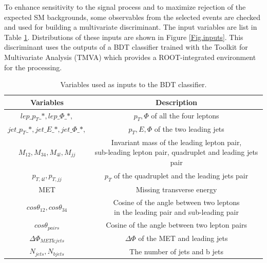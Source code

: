 To enhance sensitivity to the signal process and to maximize rejection of the expected SM backgrounds, some observables from the selected events are checked and used for building a multivariate discriminant. The input variables are list in Table \ref{Tab.bdt inputs}. Distributions of these inputs are shown in Figure \ref{Fig.inputs}. This discriminant uses the outputs of a BDT classifier trained with the Toolkit for Multivariate Analysis (TMVA) which provides a ROOT-integrated environment for the processing.

\begin{table}[H]
\begin{center}
\caption{Variables used as inputs to the BDT classifier.}
\label{Tab.bdt inputs}
\begin{tabular}{cc}
	\toprule
	\toprule	
	Variables&Description\\
	\midrule
	$lep\_p_{T}\_*,lep\_\Phi\_*,$&$p_{T},\Phi$ of all the four leptons\\
	\midrule
	$jet\_p_{T}\_*,jet\_E\_*,jet\_\Phi\_*,$&$p_{T},E,\Phi$ of the two leading jets\\
	\midrule
	$M_{12},M_{34},M_{4l},M_{jj}$&\makecell[c]{Invariant mass of the leading lepton pair, \\sub-leading lepton pair, quadruplet and leading jets pair}\\
	\midrule
	$p_{T,4l},p_{T,jj}$&$p_{T}$ of the quadruplet and the leading jets pair\\
	\midrule
	MET&Missing transverse energy\\
	\midrule
	$cos\theta_{12},cos\theta_{34}$&\makecell[c]{Cosine of the angle between two leptons \\in the leading pair and sub-leading pair}\\
	\midrule
	$cos\theta_{pairs}$&Cosine of the angle between two lepton pairs\\
	\midrule
	$\Delta\Phi_{MET\&jets}$&$\Delta\Phi$ of the MET and leading jets\\
	\midrule
	$N_{jets},N_{bjets}$&The number of jets and b jets\\
	\bottomrule
	\bottomrule
\end{tabular}
\end{center}
\end{table}

